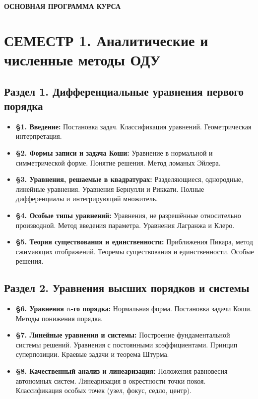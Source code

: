\documentclass[12pt]{article}
\begin{document}
\newpage

\begin{center}
{\Large\textbf{ОСНОВНАЯ ПРОГРАММА КУРСА}}
\end{center}

\section*{СЕМЕСТР 1. Аналитические и численные методы ОДУ}

\subsection*{Раздел 1. Дифференциальные уравнения первого порядка}
\begin{itemize}[nosep]
    \item \textbf{§1. Введение:} Постановка задач. Классификация уравнений. Геометрическая интерпретация.
    \item \textbf{§2. Формы записи и задача Коши:} Уравнение в нормальной и симметрической форме. Понятие решения. Метод ломаных Эйлера.
    \item \textbf{§3. Уравнения, решаемые в квадратурах:} Разделяющиеся, однородные, линейные уравнения. Уравнения Бернулли и Риккати. Полные дифференциалы и интегрирующий множитель.
    \item \textbf{§4. Особые типы уравнений:} Уравнения, не разрешённые относительно производной. Метод введения параметра. Уравнения Лагранжа и Клеро.
    \item \textbf{§5. Теория существования и единственности:} Приближения Пикара, метод сжимающих отображений. Теоремы существования и единственности. Особые решения.
\end{itemize}

\subsection*{Раздел 2. Уравнения высших порядков и системы}
\begin{itemize}[nosep]
    \item \textbf{§6. Уравнения $n$-го порядка:} Нормальная форма. Постановка задачи Коши. Методы понижения порядка.
    \item \textbf{§7. Линейные уравнения и системы:} Построение фундаментальной системы решений. Уравнения с постоянными коэффициентами. Принцип суперпозиции. Краевые задачи и теорема Штурма.
    \item \textbf{§8. Качественный анализ и линеаризация:} Положения равновесия автономных систем. Линеаризация в окрестности точки покоя. Классификация особых точек (узел, фокус, седло, центр).
\end{itemize}
\end{document}
